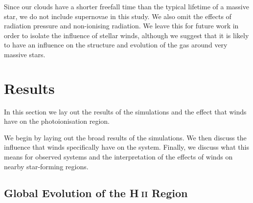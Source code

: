 \documentclass[a4paper,fleqn,usenatbib]{mnras}
\newcommand{\HII}{H$~$\textsc{ii}\xspace}
\begin{document}
Since our clouds have a shorter freefall time than the typical lifetime of a massive star, we do not include supernovae in this study. We also omit the effects of radiation pressure and non-ionising radiation. We leave this for future work in order to isolate the influence of stellar winds, although we suggest that it is likely to have an influence on the structure and evolution of the gas around very massive stars.

\section{Results}
\label{results}

In this section we lay out the results of the simulations and the effect that winds have on the photoionisation region.

We begin by laying out the broad results of the simulations. We then discuss the influence that winds specifically have on the system. Finally, we discuss what this means for observed systems and the interpretation of the effects of winds on nearby star-forming regions.

\subsection{Global Evolution of the \HII Region}
\label{results:global}
\end{document}
